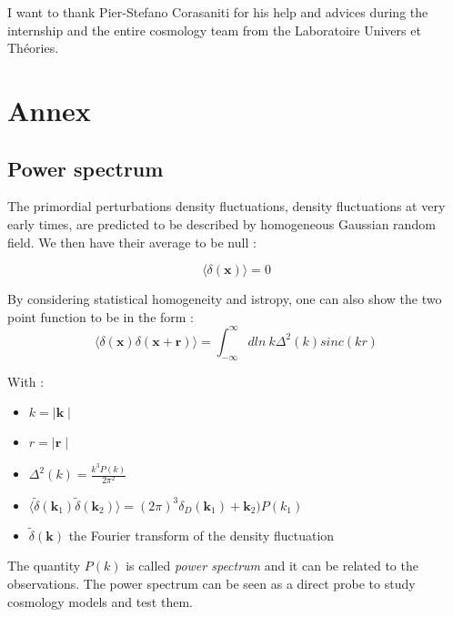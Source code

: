 I want to thank Pier-Stefano Corasaniti for his help and advices during the internship and the entire cosmology team from the Laboratoire Univers et Théories.




\newpage
\section*{Annex}


\subsection*{Power spectrum}
\label{Power spectrum Txt}
The primordial perturbations density fluctuations, density fluctuations at very early times, are predicted to be described by homogeneous Gaussian random field. We then have their average to be null :

\begin{equation}
\langle \delta (\textbf{x}) \rangle = 0
\end{equation}

By considering statistical homogeneity and istropy, one can also show the two point function to be in the form :
\begin{equation}
\label{Power Spectrum}
\langle \delta (\textbf{x}) \delta (\textbf{x} + \textbf{r}) \rangle = \int^{\infty}_{-\infty} dln \ k \Delta^2 (k) sinc(kr)
\end{equation}

With :
\begin{itemize}
    \item $k = \mid \textbf{k} \mid$
    \item $r = \mid \textbf{r} \mid$
    \item $\Delta^2 (k) = \frac{k^3 P(k)}{2\pi^2}$
    \item $\langle \widetilde{\delta} (\textbf{k}_1) \widetilde{\delta} (\textbf{k}_2) \rangle = (2\pi)^3 \delta_D (\textbf{k}_1) + \textbf{k}_2) P(k_1)$
    \item $\widetilde{\delta} (\textbf{k})$ the Fourier transform of the density fluctuation 
\end{itemize}

The quantity $P(k)$ is called \textit{power spectrum} and it can be related to the observations. The power spectrum can be seen as a direct probe to study cosmology models and test them.









